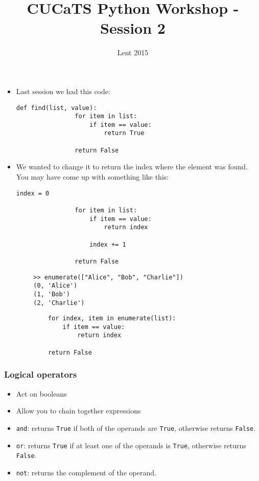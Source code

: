 \documentclass[notes]{beamer}
\title{CUCaTS Python Workshop - Session 2}
\date{Lent 2015}
\begin{document}
	\begin{frame}[fragile]
		\maketitle
	\end{frame}
	
	\begin{frame}[fragile]
		\frametitle{}
		
		\begin{itemize}
			\item Last session we had this code:
			\begin{lstlisting}[xleftmargin=\dimexpr-\leftmargini]
			def find(list, value):
			    for item in list:
			        if item == value:
			            return True
			
			    return False
			\end{lstlisting}
			
			\item We wanted to change it to return the index where the element was found. You may have come up with something like this:
			\begin{lstlisting}[xleftmargin=\dimexpr-\leftmargini]
			    index = 0
			    
			    for item in list:
			        if item == value:
			            return index
			            
			        index += 1
			
			    return False
			\end{lstlisting}
		\end{itemize}
		
		\begin{lstlisting}
		>> enumerate(["Alice", "Bob", "Charlie"])
		(0, 'Alice')
		(1, 'Bob')
		(2, 'Charlie')
		\end{lstlisting}
		
		\begin{lstlisting}
		    for index, item in enumerate(list):
		        if item == value:
		            return index
		            
		    return False
		\end{lstlisting}
		
	\end{frame}
	
	\begin{frame}[fragile]
		\frametitle{Logical operators}
		\begin{itemize}
			\item Act on booleans
			\item Allow you to chain together expressions
			\pause
			\item \lstinline|and|: returns \lstinline|True| if both of the operands are \lstinline|True|, otherwise returns \lstinline|False|.
			\item \lstinline|or|: returns \lstinline|True| if at least one of the operands is \lstinline|True|, otherwise returns \lstinline|False|.
			\item \lstinline|not|: returns the complement of the operand.
		\end{itemize}
	\end{frame}
\end{document}
